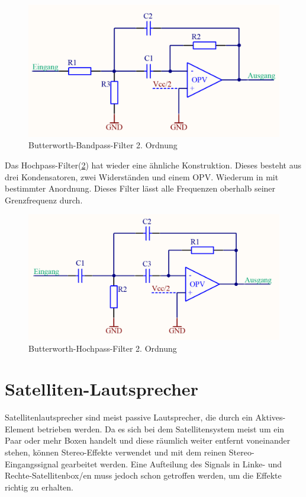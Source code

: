 \begin{figure} [H]
	\centering
	\includegraphics[width=1\textwidth]{img/Print4/BPFilter-Butterworth2Ordnung.PNG}
	\caption{Butterworth-Bandpass-Filter 2. Ordnung}
	\label {fig:3.3.2.2}
\end{figure}
Das Hochpass-Filter(\ref{fig:3.3.2.3}) hat wieder eine ähnliche Konstruktion.
Dieses besteht aus drei Kondensatoren, zwei Widerständen und einem OPV.
Wiederum in mit bestimmter Anordnung.
Dieses Filter lässt alle Frequenzen oberhalb seiner Grenzfrequenz durch.
\begin{figure} [H]
	\centering	
	\includegraphics[width=1\textwidth]{img/Print4/HPFilter-Butterworth2Ordnung.PNG}
	\caption{Butterworth-Hochpass-Filter 2. Ordnung}
	\label {fig:3.3.2.3}
\end{figure}

\section{Satelliten-Lautsprecher}\label{sec:3.4}
Satellitenlautsprecher sind meist passive Lautsprecher, die durch ein Aktives-Element betrieben werden.
Da es sich bei dem Satellitensystem meist um ein Paar oder mehr Boxen handelt und diese räumlich weiter entfernt voneinander stehen, können Stereo-Effekte verwendet und mit dem reinen Stereo-Eingangssignal gearbeitet werden.
Eine Aufteilung des Signals in Linke- und Rechte-Satellitenbox/en muss jedoch schon getroffen werden, um die Effekte richtig zu erhalten.

